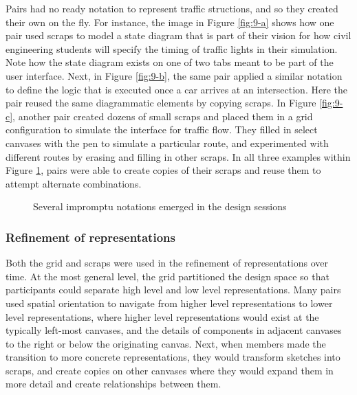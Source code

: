 Pairs had no ready notation to represent traffic structions, and so they created their own on the fly. For instance, the image in Figure \ref{fig:9-a} shows how one pair used scraps to model a state diagram that is part of their vision for how civil engineering students will specify the timing of traffic lights in their simulation. Note how the state diagram exists on one of two tabs meant to be part of the user interface. Next, in Figure \ref{fig:9-b}, the same pair applied a similar notation to define the logic that is executed once a car arrives at an intersection. Here the pair reused the same diagrammatic elements by copying scraps. In Figure \ref{fig:9-c}, another pair created dozens of small scraps and placed them in a grid configuration to simulate the interface for traffic flow. They filled in select canvases with the pen to simulate a particular route, and experimented with different routes by erasing and filling in other scraps. In all three examples within Figure \ref{fig:9}, pairs were able to create copies of their scraps and reuse them to attempt alternate combinations. 

\begin{figure}%
  \centering
   \caption {Several impromptu notations emerged in the design sessions}
   \label{fig:9}
\end{figure}%

\subsubsection {Refinement of representations}
\label{results:24}

Both the grid and scraps were used in the refinement of representations over time. At the most general level, the grid partitioned the design space so that participants could separate high level and low level representations. Many pairs used spatial orientation to navigate from higher level representations to lower level representations, where higher level representations would exist at the typically left-most canvases, and the details of components in adjacent canvases to the right or below the originating canvas. Next, when members made the transition to more concrete representations, they would transform sketches into scraps, and create copies on other canvases where they would expand them in more detail and create relationships between them. 

